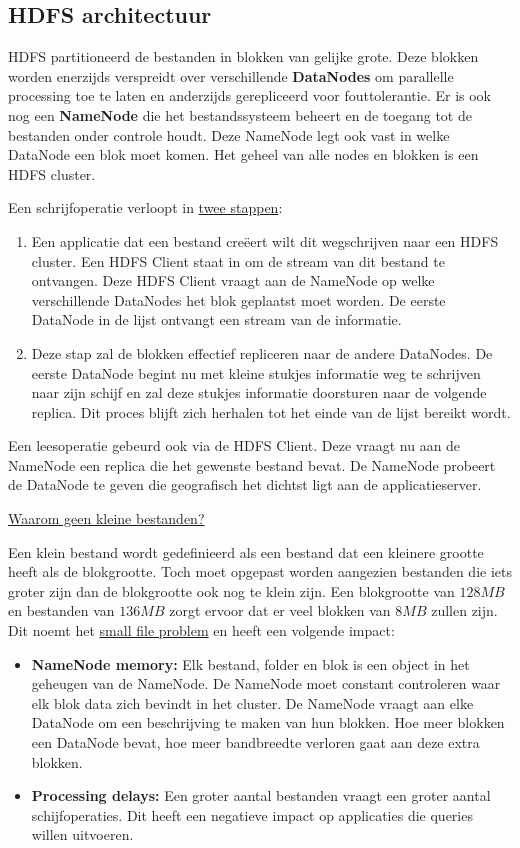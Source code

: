 	\subsection{HDFS architectuur}
	HDFS partitioneerd de bestanden in blokken van gelijke grote. Deze blokken worden enerzijds verspreidt over verschillende \textbf{DataNodes} om parallelle processing toe te laten en anderzijds gerepliceerd voor fouttolerantie. Er is ook nog een \textbf{NameNode} die het bestandssysteem beheert en de toegang tot de bestanden onder controle houdt.  Deze NameNode legt ook vast in welke DataNode een blok moet komen. Het geheel van alle nodes en blokken is een HDFS cluster. 
	
	Een schrijfoperatie verloopt in \uline{twee stappen}:
	\begin{enumerate}
		\item Een applicatie dat een bestand creëert wilt dit wegschrijven naar een HDFS cluster. Een HDFS Client staat in om de stream van dit bestand te ontvangen. Deze HDFS Client vraagt aan de NameNode op welke verschillende DataNodes het blok geplaatst moet worden. De eerste DataNode in de lijst ontvangt een stream van de informatie.
		\item Deze stap zal de blokken effectief repliceren naar de andere DataNodes. De eerste DataNode begint nu met kleine stukjes informatie weg te schrijven naar zijn schijf en zal deze stukjes informatie doorsturen naar de volgende replica. Dit proces blijft zich herhalen tot het einde van de lijst bereikt wordt.
	\end{enumerate}

	Een leesoperatie gebeurd ook via de HDFS Client. Deze vraagt nu aan de NameNode een replica die het gewenste bestand bevat. De NameNode probeert de DataNode te geven die geografisch het dichtst ligt aan de applicatieserver.
	
	\underline{Waarom geen kleine bestanden?}
	
	Een klein bestand wordt gedefinieerd als een bestand dat een kleinere grootte heeft als de blokgrootte. Toch moet opgepast worden aangezien bestanden die iets groter zijn dan de blokgrootte ook nog te klein zijn. Een blokgrootte van $128 MB$ en bestanden van $136 MB$ zorgt ervoor dat er veel blokken van $8 MB$ zullen zijn. Dit noemt het \underline{small file problem} en heeft een volgende impact:
	\begin{itemize}
		\item \textbf{NameNode memory:} Elk bestand, folder en blok is een object in het geheugen van de NameNode. De NameNode moet constant controleren waar elk blok data zich bevindt in het cluster. De NameNode vraagt aan elke DataNode om een beschrijving te maken van hun blokken. Hoe meer blokken een DataNode bevat, hoe meer bandbreedte verloren gaat aan deze extra blokken.
		\item \textbf{Processing delays:} Een groter aantal bestanden vraagt een groter aantal schijfoperaties. Dit heeft een negatieve impact op applicaties die queries willen uitvoeren.
	\end{itemize}

